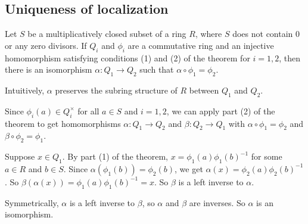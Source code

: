 \documentclass[12pt,letterpaper]{report}
\begin{document}
\pagebreak
\subsection{Uniqueness of localization}

\begin{cor}{}{}
  Let $S$ be a multiplicatively closed subset of a ring $R$, where $S$ does not contain 0 or any
  zero divisors.
  If $Q_i$ and $\phi_i$ are a commutative ring and an injective homomorphism satisfying conditions
  (1) and (2) of the theorem for $i = 1, 2$, then there is an isomorphism
  $\alpha \colon Q_1 \to Q_2$ such that $\alpha \circ \phi_1 = \phi_2$.
\end{cor}

\begin{center}
\end{center}

Intuitively, $\alpha$ preserves the subring structure of $R$ between $Q_1$ and $Q_2$.

\begin{thmproof}
  \begin{multicols}{2}
    Since $\phi_i(a) \in Q_i^\times$ for all $a \in S$ and $i = 1, 2$, we can apply part (2) of the
    theorem to get homomorphisms $\alpha \colon Q_1 \to Q_2$ and $\beta \colon Q_2 \to Q_1$
    with $\alpha \circ \phi_1 = \phi_2$ and $\beta \circ \phi_2 = \phi_1$.

    \begin{center}
    \end{center}
  \end{multicols}

  Suppose $x \in Q_1$.
  By part (1) of the theorem, $x = \phi_1(a)\phi_1(b)^{-1}$ for some $a \in R$ and $b \in S$.
  Since $\alpha(\phi_1(b)) = \phi_2(b)$, we get $\alpha(x) = \phi_2(a)\phi_2(b)^{-1}$.
  So $\beta(\alpha(x)) = \phi_1(a)\phi_1(b)^{-1} = x$.
  So $\beta$ is a left inverse to $\alpha$.

  Symmetrically, $\alpha$ is a left inverse to $\beta$, so $\alpha$ and $\beta$ are inverses.
  So $\alpha$ is an isomorphism.
\end{thmproof}
\end{document}
